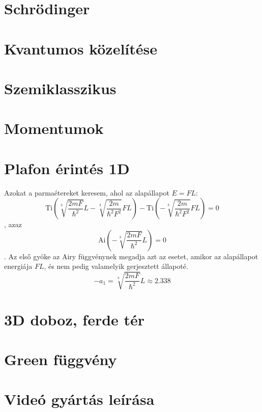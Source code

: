 \documentclass[pdftex,12pt,a4paper]{article}
\newcommand{\Ai}[1]{\mathrm{Ai}\left(#1\right)}
\newcommand{\Ti}[1]{\mathrm{Ti}\left(#1\right)}
\begin{document}
\addtolength{\marginparwidth}{50pt}



\newpage
\tableofcontents
\newpage
\listoffigures
\listoftables
\newpage
{}
\section{Schrödinger}
	
\section{Kvantumos közelítése}
	
\section{Szemiklasszikus}
	
\section{Momentumok}
	
	
\section{Plafon érintés 1D}
	Azokat a parmaétereket keresem, ahol az alapállapot $E = FL$:
	\begin{equation}
		\Ti{\sqrt[3]{\frac{2mF}{\hbar^2}}L - \sqrt[3]{\frac{2m}{\hbar^2F^2}}FL} - \Ti{-\sqrt[3]{\frac{2m}{\hbar^2F^2}}FL} = 0
	\end{equation}
	, azaz
	\begin{equation}
		\Ai{-\sqrt[3]{\frac{2mF}{\hbar^2}}L} = 0
	\end{equation}
	. Az első gyöke az Airy függvénynek megadja azt az esetet, amikor az alapállapot energiája $FL$, és nem pedig valamelyik gerjesztett állapoté.
	\begin{equation}
		-a_1 = \sqrt[3]{\frac{2mF}{\hbar^2}}L \approx 2.338
	\end{equation}



\section{3D doboz, ferde tér}
    
    
\section{Green függvény}
	
    
\section{Videó gyártás leírása}
    
    
    
\end{document}

